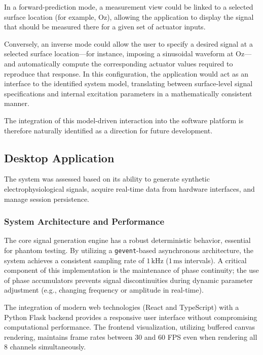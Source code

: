 \documentclass[../00_Main.tex]{subfiles}
\begin{document}
In a forward-prediction mode, a measurement view could be linked to a selected surface
location (for example, Oz), allowing the application to display the signal that should be
measured there for a given set of actuator inputs.

Conversely, an inverse mode could allow the user to specify a desired signal at a selected
surface location---for instance, imposing a sinusoidal waveform at Oz---and automatically
compute the corresponding actuator values required to reproduce that response.
In this configuration, the application would act as an interface to the identified system
model, translating between surface-level signal specifications and internal excitation
parameters in a mathematically consistent manner.

The integration of this model-driven interaction into the software platform is therefore
naturally identified as a direction for future development.

\subsection{Desktop Application}

The system was assessed based on its ability to generate synthetic electrophysiological signals, acquire real-time data from hardware interfaces, and manage session persistence.

\subsubsection{System Architecture and Performance}

The core signal generation engine has a robust deterministic behavior, essential for phantom testing. By utilizing a \texttt{gevent}-based asynchronous architecture, the system achieves a consistent sampling rate of $1\,\text{kHz}$ ($1\,\text{ms}$ intervals). A critical component of this implementation is the maintenance of phase continuity; the use of phase accumulators prevents signal discontinuities during dynamic parameter adjustment (e.g., changing frequency or amplitude in real-time).

The integration of modern web technologies (React and TypeScript) with a Python Flask backend provides a responsive user interface without compromising computational performance. The frontend visualization, utilizing buffered canvas rendering, maintains frame rates between 30 and 60 FPS even when rendering all 8 channels simultaneously.
\end{document}
